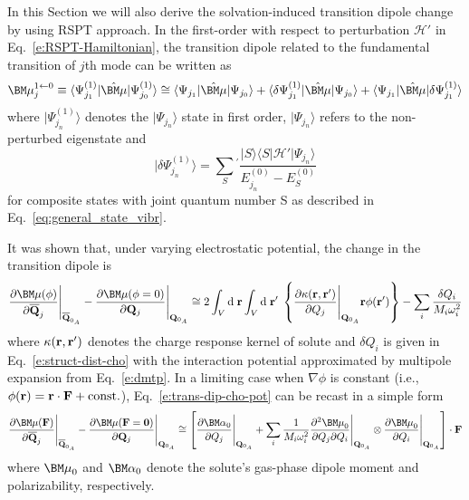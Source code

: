 In this Section we will also derive the solvation-induced transition dipole
change by using RSPT approach.
In the first-order with respect to perturbation $\mathscr{H}'$ in Eq.~\eqref{e:RSPT-Hamiltonian},
the transition dipole related to the fundamental transition of $j$th mode 
can be written as
%
\begin{equation}
{\BM \mu}_j^{1 \leftarrow 0} \equiv \langle \Psi_{j_1}^{(1)} \vert \hat{\BM \mu} \vert \Psi_{j_0}^{(1)} \rangle 
\cong
%
\langle \Psi_{j_1} \vert \hat{\BM \mu} \vert \Psi_{j_0} \rangle
+
\langle \delta \Psi_{j_1}^{(1)} \vert \hat{\BM \mu} \vert \Psi_{j_0} \rangle
+
\langle \Psi_{j_1} \vert \hat{\BM \mu} \vert \delta \Psi_{j_1}^{(1)} \rangle
\end{equation}
%
where $\vert \Psi_{j_n}^{(1)} \rangle$ denotes the $\vert \Psi_{j_n} \rangle$ state in first order,
$\vert \Psi_{j_n} \rangle$ refers to the non\hyp{}perturbed eigenstate
and 
%
\begin{equation}
\vert \delta \Psi_{j_n}^{(1)} \rangle = \sum_S{^{'}} \frac{
\vert S \rangle \langle S \vert \mathscr{H}' \vert \Psi_{j_n} \rangle 
}{E^{(0)}_{j_n} - E^{(0)}_S}
\end{equation}
% 
for composite states with joint quantum number S as described in Eq.~\eqref{eq:general_state_vibr}.



It was shown that, under varying electrostatic potential,
the change in the transition dipole is\citep{Cho.JCP.2009}
%
\begin{equation} \label{e:trans-dip-cho-pot}
 \frac{\partial{\BM \mu}(\phi)}{\partial\overline {\bf Q}_j} \Bigg|_{\overline{\bf Q}_{0_A}} -  
 \frac{\partial{\BM \mu}(\phi=0)}{\partial {\bf Q}_j} \Bigg|_{{\bf Q}_{0_A}} \cong
%
2\int_V {\rm d}\;{\bf r} \int_V    {\rm d}\;{\bf r}' \; 
\left\{
\frac{\partial \kappa({\bf r},{\bf r}')}{\partial Q_j} \Bigg|_{{\bf Q}_{0_A}} {\bf r} \phi({\bf r}')
\right\}
%
- \sum_i \frac{\delta Q_i}{M_i\omega_i^2}
\end{equation}
%
where $\kappa({\bf r},{\bf r}')$ denotes the charge response kernel
of solute and $\delta Q_i$ is given in Eq.~\eqref{e:struct-dist-cho} with
the interaction potential approximated by multipole expansion from
Eq.~\eqref{e:dmtp}. In a limiting case when $\nabla \phi$ is constant
(i.e., $\phi({\bf r}) = {\bf r} \cdot {\bf F} + {\rm const.}$), 
Eq.~\eqref{e:trans-dip-cho-pot} can be recast 
in a simple form
%
\begin{equation} \label{e:trans-dip-cho-field}
 \frac{\partial{\BM \mu}({\bf F})}{\partial\overline {\bf Q}_j} \Bigg|_{\overline{\bf Q}_{0_A}} -  
 \frac{\partial{\BM \mu}({\bf F}={\bf 0})}{\partial {\bf Q}_j} \Bigg|_{{\bf Q}_{0_A}} \cong
%
\left[
\frac{\partial {\BM \alpha}_0}{\partial Q_j} \Bigg|_{{\bf Q}_{0_A}} 
+ 
\sum_i \frac{1}{M_i\omega_i^2} 
\frac{\partial^2 {\BM \mu}_0}{\partial Q_j \partial Q_i} \Bigg|_{{\bf Q}_{0_A}}
\otimes
\frac{\partial {\BM \mu}_0}{\partial Q_i} \Bigg|_{{\bf Q}_{0_A}}
\right] 
\cdot {\bf F}
\end{equation}
%
where ${\BM \mu}_0$ and ${\BM \alpha}_0$ denote the solute's gas\hyp{}phase dipole moment
and polarizability, respectively.
